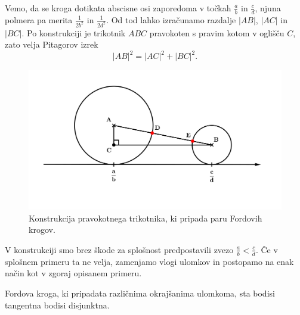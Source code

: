 \documentclass[mat1]{fmfdelo}
\begin{document}
Vemo, da se kroga dotikata abscisne osi zaporedoma v točkah $\frac{a}{b}$ in $\frac{c}{d}$, njuna polmera pa merita $\frac{1}{2b^2}$ in $\frac{1}{2d^2}$. Od tod lahko izračunamo razdalje $|AB|$, $|AC|$ in $|BC|$.
Po konstrukciji je trikotnik $ABC$ pravokoten s pravim kotom v oglišču $C$, zato velja Pitagorov izrek
\begin{equation}
\label{Eq:Pitagora}
|AB|^2 = |AC|^2 + |BC|^2. 
\end{equation}

\begin{figure}[h!]
\begin{center}
\includegraphics[scale=0.4]{pitagora.png}
\caption{Konstrukcija pravokotnega trikotnika, ki pripada paru Fordovih krogov.}
\label{Fig:Pitagora}
\end{center}
\end{figure}

\begin{opomba}
V konstrukciji smo brez škode za splošnost predpostavili zvezo $\frac{a}{b} < \frac{c}{d}$. Če v splošnem primeru ta ne velja, zamenjamo vlogi ulomkov in postopamo na enak način kot v zgoraj opisanem primeru.
\end{opomba}
%

\begin{trditev}
\label{trd:FordDisjTang}
Fordova kroga, ki pripadata različnima okrajšanima ulomkoma, sta bodisi tangentna bodisi disjunktna.
\end{trditev}
\end{document}
